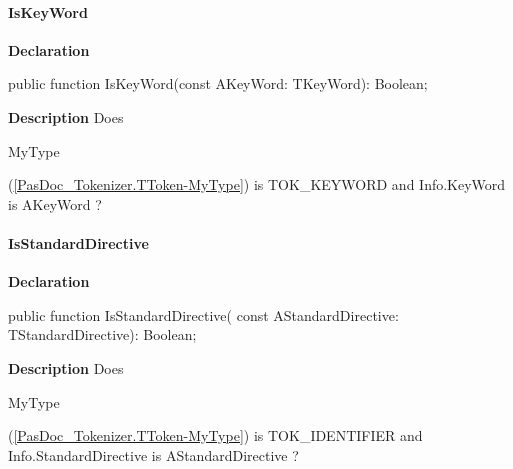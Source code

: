 \documentclass{report}
\newif\ifpdf
\begin{document}
\paragraph*{IsKeyWord}\hspace*{\fill}

\label{PasDoc_Tokenizer.TToken-IsKeyWord}
\begin{list}{}{
\setlength{\itemindent}{0cm}
\setlength{\listparindent}{0cm}
\setlength{\leftmargin}{\evensidemargin}
\addtolength{\leftmargin}{\tmplength}
\settowidth{\labelsep}{X}
\addtolength{\leftmargin}{\labelsep}
\setlength{\labelwidth}{\tmplength}
}
\item[\textbf{Declaration}\hfill]
\ifpdf
\begin{flushleft}
\fi
\begin{ttfamily}
public function IsKeyWord(const AKeyWord: TKeyWord): Boolean;\end{ttfamily}

\ifpdf
\end{flushleft}
\fi

\par
\item[\textbf{Description}]
Does \begin{ttfamily}MyType\end{ttfamily}(\ref{PasDoc_Tokenizer.TToken-MyType}) is TOK{\_}KEYWORD and Info.KeyWord is AKeyWord ?

\end{list}
\paragraph*{IsStandardDirective}\hspace*{\fill}

\label{PasDoc_Tokenizer.TToken-IsStandardDirective}
\begin{list}{}{
\setlength{\itemindent}{0cm}
\setlength{\listparindent}{0cm}
\setlength{\leftmargin}{\evensidemargin}
\addtolength{\leftmargin}{\tmplength}
\settowidth{\labelsep}{X}
\addtolength{\leftmargin}{\labelsep}
\setlength{\labelwidth}{\tmplength}
}
\item[\textbf{Declaration}\hfill]
\ifpdf
\begin{flushleft}
\fi
\begin{ttfamily}
public function IsStandardDirective( const AStandardDirective: TStandardDirective): Boolean;\end{ttfamily}

\ifpdf
\end{flushleft}
\fi

\par
\item[\textbf{Description}]
Does \begin{ttfamily}MyType\end{ttfamily}(\ref{PasDoc_Tokenizer.TToken-MyType}) is TOK{\_}IDENTIFIER and Info.StandardDirective is AStandardDirective ?

\end{list}
\end{document}
